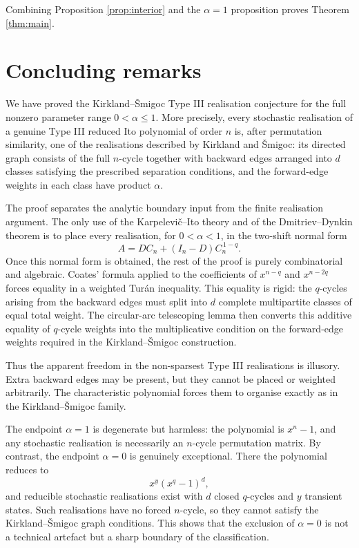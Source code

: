 \documentclass[11pt]{article}
\numberwithin{equation}{section}
\begin{document}
Combining Proposition \ref{prop:interior} and the $\alpha=1$ proposition
proves Theorem \ref{thm:main}.

\section{Concluding remarks}

We have proved the Kirkland--\v{S}migoc Type III realisation conjecture for
the full nonzero parameter range $0<\alpha\le1$. More precisely, every
stochastic realisation of a genuine Type III reduced Ito polynomial of order
$n$ is, after permutation similarity, one of the realisations described by
Kirkland and \v{S}migoc: its directed graph consists of the full $n$-cycle
together with backward edges arranged into $d$ classes satisfying the
prescribed separation conditions, and the forward-edge weights in each class
have product $\alpha$.

The proof separates the analytic boundary input from the finite realisation
argument. The only use of the Karpelevi\v{c}--Ito theory and of the
Dmitriev--Dynkin theorem is to place every realisation, for $0<\alpha<1$, in
the two-shift normal form
\[
        A=DC_n+(I_n-D)C_n^{\,1-q}.
\]
Once this normal form is obtained, the rest of the proof is purely
combinatorial and algebraic. Coates' formula applied to the coefficients of
$x^{n-q}$ and $x^{n-2q}$ forces equality in a weighted Tur\'an inequality.
This equality is rigid: the $q$-cycles arising from the backward edges must
split into $d$ complete multipartite classes of equal total weight. The
circular-arc telescoping lemma then converts this additive equality of
$q$-cycle weights into the multiplicative condition on the forward-edge
weights required in the Kirkland--\v{S}migoc construction.

Thus the apparent freedom in the non-sparsest Type III realisations is
illusory. Extra backward edges may be present, but they cannot be placed or
weighted arbitrarily. The characteristic polynomial forces them to organise
exactly as in the Kirkland--\v{S}migoc family.

The endpoint $\alpha=1$ is degenerate but harmless: the polynomial is
$x^n-1$, and any stochastic realisation is necessarily an $n$-cycle
permutation matrix. By contrast, the endpoint $\alpha=0$ is genuinely
exceptional. There the polynomial reduces to
\[
        x^y(x^q-1)^d,
\]
and reducible stochastic realisations exist with $d$ closed $q$-cycles and
$y$ transient states. Such realisations have no forced $n$-cycle, so they
cannot satisfy the Kirkland--\v{S}migoc graph conditions. This shows that the
exclusion of $\alpha=0$ is not a technical artefact but a sharp boundary of
the classification.
\end{document}
